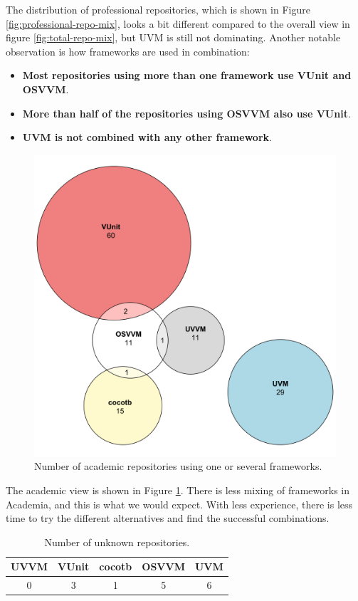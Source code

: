 \documentclass[]{article}
\providecommand{\tightlist}{%
  \setlength{\itemsep}{0pt}\setlength{\parskip}{0pt}}
\begin{document}
The distribution of professional repositories, which is shown in Figure \ref{fig:professional-repo-mix}, looks a bit different compared to the overall view in figure \ref{fig:total-repo-mix}, but UVM is still not dominating. Another notable observation is how frameworks are used in combination:

\begin{itemize}
\tightlist
\item
  \textbf{Most repositories using more than one framework use VUnit and OSVVM}.
\item
  \textbf{More than half of the repositories using OSVVM also use VUnit}.
\item
  \textbf{UVM is not combined with any other framework}.
\end{itemize}

\begin{figure}

{\centering \includegraphics[width=0.75\linewidth]{img/academic_repo_framework_distribution} 

}

\caption{Number of academic repositories using one or several frameworks.}\label{fig:academic-repo-mix}
\end{figure}

The academic view is shown in Figure \ref{fig:academic-repo-mix}. There is less mixing of frameworks in Academia, and this is what we would expect. With less experience, there is less time to try the different alternatives and find the successful combinations.

\begin{table}

\caption{\label{tab:unknown-tab}Number of unknown repositories.}
\centering
\begin{tabular}[t]{ccccc}
\toprule
UVVM & VUnit & cocotb & OSVVM & UVM\\
\midrule
0 & 3 & 1 & 5 & 6\\
\bottomrule
\end{tabular}
\end{table}
\end{document}
